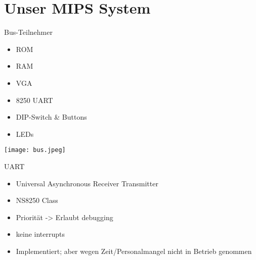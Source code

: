 

\section{Unser MIPS System}

\begin{frame}{Bus-Teilnehmer}

\begin{itemize}
	\item ROM
	\item RAM
	\item VGA
	\item 8250 UART
	\pause
	\item DIP-Switch \& Buttons
	\item LEDs
\end{itemize}


\begin{center}
\texttt{[image: bus.jpeg]} %
\end{center}

\end{frame}

\begin{frame}{UART}

\begin{itemize}
	\item Universal Asynchronous Receiver Transmitter
	\item NS8250 Class 
	\item Priorität -> Erlaubt debugging
	\item keine interrupts
	\pause
	\item Implementiert; aber wegen Zeit/Personalmangel nicht in Betrieb genommen
\end{itemize}
\begin{center}
\end{center}


\end{frame}

